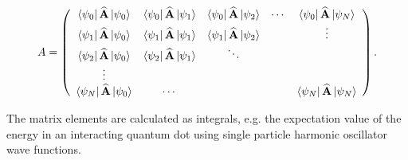 \begin{equation}
A = \left( 
\begin{array}{ccccc}
\left< \psi_0 \right| {\bf\widehat{A}} \left| \psi_0 \right>  &  \left< \psi_0 \right| {\bf\widehat{A}} \left| \psi_1 \right> & \left< \psi_0 \right| {\bf\widehat{A}} \left| \psi_2 \right> & \cdots &  \left< \psi_0 \right| {\bf\widehat{A}} \left| \psi_N \right>\\
\left< \psi_1 \right| {\bf\widehat{A}} \left| \psi_0 \right>  &  \left< \psi_1 \right| {\bf\widehat{A}} \left| \psi_1 \right> & \left< \psi_1 \right| {\bf\widehat{A}} \left| \psi_2 \right> &        &  \vdots                          \\
\left< \psi_2 \right| {\bf\widehat{A}} \left| \psi_0 \right>  &  \left< \psi_2 \right| {\bf\widehat{A}} \left| \psi_1 \right> & \ddots                           &        &                                  \\
\vdots                            &                                   &                                  &        &                                  \\
\left< \psi_N \right| {\bf\widehat{A}} \left| \psi_0 \right>  &  \cdots                           &                                  &        &  \left< \psi_N \right| {\bf\widehat{A}} \left| \psi_N \right>\\
\end{array} \right).
\end{equation}

The matrix elements are calculated as integrals, e.g. the expectation value of the energy in an interacting quantum dot using single particle harmonic oscillator wave functions.


